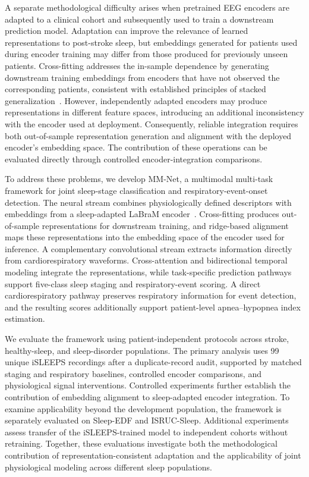 \documentclass[a4paper,fleqn]{cas-sc}
\begin{document}
A separate methodological difficulty arises when pretrained EEG encoders are adapted to a clinical cohort and subsequently used to train a downstream prediction model. Adaptation can improve the relevance of learned representations to post-stroke sleep, but embeddings generated for patients used during encoder training may differ from those produced for previously unseen patients. Cross-fitting addresses the in-sample dependence by generating downstream training embeddings from encoders that have not observed the corresponding patients, consistent with established principles of stacked generalization~\cite{wolpert1992stacked,chernozhukov2018dml}. However, independently adapted encoders may produce representations in different feature spaces, introducing an additional inconsistency with the encoder used at deployment. Consequently, reliable integration requires both out-of-sample representation generation and alignment with the deployed encoder's embedding space. The contribution of these operations can be evaluated directly through controlled encoder-integration comparisons.

To address these problems, we develop MM-Net, a multimodal multi-task framework for joint sleep-stage classification and respiratory-event-onset detection. The neural stream combines physiologically defined descriptors with embeddings from a sleep-adapted LaBraM encoder~\cite{labram2024}. Cross-fitting produces out-of-sample representations for downstream training, and ridge-based alignment maps these representations into the embedding space of the encoder used for inference. A complementary convolutional stream extracts information directly from cardiorespiratory waveforms. Cross-attention and bidirectional temporal modeling integrate the representations, while task-specific prediction pathways support five-class sleep staging and respiratory-event scoring. A direct cardiorespiratory pathway preserves respiratory information for event detection, and the resulting scores additionally support patient-level apnea--hypopnea index estimation.

We evaluate the framework using patient-independent protocols across stroke, healthy-sleep, and sleep-disorder populations. The primary analysis uses 99 unique iSLEEPS recordings after a duplicate-record audit, supported by matched staging and respiratory baselines, controlled encoder comparisons, and physiological signal interventions. Controlled experiments further establish the contribution of embedding alignment to sleep-adapted encoder integration. To examine applicability beyond the development population, the framework is separately evaluated on Sleep-EDF and ISRUC-Sleep. Additional experiments assess transfer of the iSLEEPS-trained model to independent cohorts without retraining. Together, these evaluations investigate both the methodological contribution of representation-consistent adaptation and the applicability of joint physiological modeling across different sleep populations.
\end{document}
